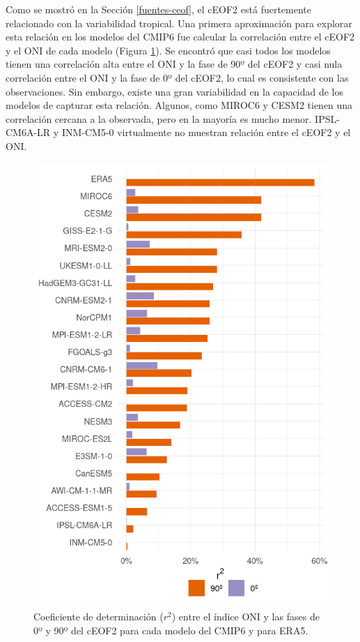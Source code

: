 \documentclass[12pt,oneside,a4paper]{reedthesis}
\begin{document}
Como se mostró en la Sección \ref{fuentes-ceof}, el cEOF2 está fuertemente relacionado con la variabilidad tropical.
Una primera aproximación para explorar esta relación en los modelos del CMIP6 fue calcular la correlación entre el cEOF2 y el ONI de cada modelo (Figura \ref{fig:cor-enso-plot}).
Se encontró que casi todos los modelos tienen una correlación alta entre el ONI y la fase de 90º del cEOF2 y casi nula correlación entre el ONI y la fase de 0º del cEOF2, lo cual es consistente con las observaciones.
Sin embargo, existe una gran variabilidad en la capacidad de los modelos de capturar esta relación.
Algunos, como MIROC6 y CESM2 tienen una correlación cercana a la observada, pero en la mayoría es mucho menor.
IPSL-CM6A-LR y INM-CM5-0 virtualmente no muestran relación entre el cEOF2 y el ONI.



\begin{figure}

{\centering \includegraphics{figures/50-cmip6/cor-enso-plot-1} 

}

\caption{Coeficiente de determinación (\(r^2\)) entre el índice ONI y las fases de 0º y 90º del cEOF2 para cada modelo del CMIP6 y para ERA5.}\label{fig:cor-enso-plot}
\end{figure}
\end{document}
